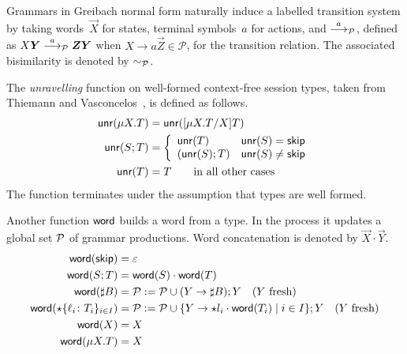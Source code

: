 
Grammars in Greibach normal form naturally induce a labelled
transition system by taking words~$\vec X$ for states, terminal
symbols~$a$ for actions, and $\stackrel{a}{\longrightarrow}_\mathcal P$, defined as
$X\vec Y\LTSderivesP \vec Z\vec Y$ when
$X \rightarrow a\vec Z \in \mathcal P$, for the transition relation.
The associated bisimilarity is denoted by $\sim_\mathcal P$.


The \emph{unravelling} function on well-formed context-free session
types, taken from Thiemann and Vasconcelos~\cite{thiemann2016context},
is defined as follows.
%
\begin{align*}
  \Unravel(\mu X.T) & = \Unravel(\subs{\mu X.T}XT)
  \\
  \Unravel (S;T) &= \left\{%
  \begin{array}{ll}
    \Unravel(T) & \Unravel(S) = \skipk
    \\
    (\Unravel(S); T) & \Unravel(S) \ne \skipk
  \end{array}
                        \right.
  \\
  \Unravel (T) &= T \qquad \text{in all other cases}
\end{align*}
%
The function terminates under the assumption that types are well
formed. 


Another function $\mathsf{word}$ builds a word from a type. In the process it updates a
global set $\mathcal P$ of grammar productions. Word concatenation is
denoted by $\vec X\cdot\vec Y$.
%
\begin{align*}
  \mathsf{word}(\mathsf{skip}) &= \varepsilon
  \\
  \mathsf{word}(S;T) &= \mathsf{word}(S) \cdot \mathsf{word}(T)
  \\
  \mathsf{word}(\sharp B) &=
    \mathcal P := \mathcal P \cup (Y \rightarrow \sharp B); Y
    \quad (Y\text{ fresh})
  \\
  \mathsf{word}(\star\{\ell_i\colon T_i\}_{i\in I}) &=
    \mathcal P := \mathcal P \cup \{Y \rightarrow\star l_i\cdot \mathsf{word}(T_i) \mid i\in I\}; Y
    \quad (Y\text{ fresh})
  \\
  \mathsf{word}(X) &= X
  \\
  \mathsf{word}(\mu X.T) &= X
\end{align*}


